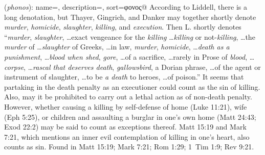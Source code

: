 \item[Killing,]

(\textit{phonos}):
{
    name=,
    description={},
    sort=φονος@
}
According to Liddell, there is a long denotation, but Thayer, Gingrich, and Danker may together shortly denote \emph{murder}, \emph{homicide}, \emph{slaughter}, \emph{killing}, and \emph{execution}. Then L. shortly denotes ``\emph{murder}, \emph{slaughter}, \ldots exact vengeance for the \emph{killing} \ldots \emph{killing} or not-\emph{killing}, \ldots the \emph{murder} of \ldots \emph{slaughter} of Greeks, \ldots in law, \emph{murder}, \emph{homicide}, \ldots \emph{death as a punishment}, \ldots \emph{blood when shed}, \emph{gore}, \ldots of a sacrifice, \ldots rarely in Prose of \emph{blood}, \ldots \emph{corpse}, \ldots \emph{rascal that deserves death}, \emph{gallowsbird}, a Dorian phrase, \ldots of the agent or instrument of slaughter, \ldots to be \emph{a death} to heroes, \ldots of poison.'' It seems that partaking in the death penalty as an executioner could count as the sin of killing. Also, may it be prohibited to carry out a lethal action as of non-death penalty. However, whether causing a killing by self-defense of home (Luke 11:21), wife (Eph 5:25), or children and assaulting a burglar in one's own home (Matt 24:43; Exod 22:2) may be said to count as exceptions thereof. Matt 15:19 and Mark 7:21, which mentions an inner evil contemplation of killing in one's heart, also counts as sin.
Found in Matt 15:19; Mark 7:21; Rom 1:29; 1~Tim 1:9; Rev 9:21.
